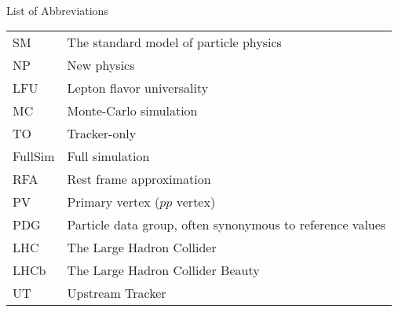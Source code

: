 \singlespacing \normalsize
\hbox{\ }

\vspace{.5in}

\begin{center}
\large{List of Abbreviations}
\end{center}

\vspace{3pt}

\begin{supertabular}{ll}
    SM      & The standard model of particle physics \\
    NP      & New physics \\
    LFU     & Lepton flavor universality \\
    MC      & Monte-Carlo simulation \\
    TO      & Tracker-only \\
    FullSim & Full simulation \\
    RFA     & Rest frame approximation \\
    PV      & Primary vertex ($pp$ vertex) \\
    PDG     & Particle data group, often synonymous to reference values \\
    LHC     & The Large Hadron Collider \\
    LHCb    & The Large Hadron Collider Beauty \\
    UT      & Upstream Tracker \\
\end{supertabular}
